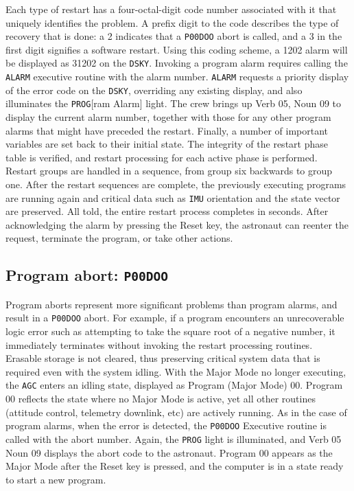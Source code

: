 \documentclass[refcap, oxford]{ahsan}
\begin{document}
Each type of restart has a four-octal-digit code number associated with it that uniquely identifies the problem. A prefix digit to the code describes the type of recovery that is done: a 2 indicates that a \texttt{P00DOO} abort is called, and a 3 in the first digit signifies a software restart. Using this coding scheme, a 1202 alarm will be displayed as 31202 on the \texttt{DSKY}. Invoking a program alarm requires calling the \texttt{ALARM} executive routine with the alarm number. \texttt{ALARM} requests a priority display of the error code on the \texttt{DSKY}, overriding any existing display, and also illuminates the \texttt{PROG}[ram Alarm] light. The crew brings up Verb 05, Noun 09 to display the current alarm number, together with those for any other program alarms that might have preceded the restart. Finally, a number of important variables are set back to their initial state. The integrity of the restart phase table is verified, and restart processing for each active phase is performed. Restart groups are handled in a sequence, from group six backwards to group one. After the restart sequences are complete, the previously executing programs are running again and critical data such as \texttt{IMU} orientation and the state vector are preserved. All told, the entire restart process completes in seconds. After acknowledging the alarm by pressing the Reset key, the astronaut can reenter the request, terminate the program, or take other actions.


\subsection{Program abort: \texttt{P00DOO}}
Program aborts represent more significant problems than program alarms, and result in a \texttt{P00DOO} abort. For example, if a program encounters an unrecoverable logic error such as attempting to take the square root of a negative number, it immediately terminates without invoking the restart processing routines. Erasable storage is not cleared, thus preserving critical system data that is required even with the system idling. With the Major Mode no longer executing, the \texttt{AGC} enters an idling state, displayed as Program (Major Mode) 00. Program 00 reflects the state where no Major Mode is active, yet all other routines (attitude control, telemetry downlink, etc) are actively running. As in the case of program alarms, when the error is detected, the \texttt{P00DOO} Executive routine is called with the abort number. Again, the \texttt{PROG} light is illuminated, and Verb 05 Noun 09 displays the abort code to the astronaut. Program 00 appears as the Major Mode after the Reset key is pressed, and the computer is in a state ready to start a new program.
\end{document}

